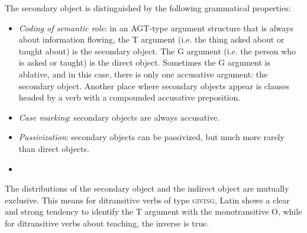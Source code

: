 \documentclass[a4paper, oneside]{report}
\newcommand{\classify}[1]{{\textsc{#1}}}
\begin{document}
The secondary object is distinguished by the following grammatical properties:
\begin{itemize}
    \item \emph{Coding of semantic role}: in an AGT-type argument structure
    that is always about information flowing,
    the T argument (i.e. the thing asked about or taught about) is the secondary object.
    The G argument (i.e. the person who is asked or taught) is the direct object.
    Sometimes the G argument is ablative, and in this case, 
    there is only one accusative argument: the secondary object.
    Another place where secondary objects appear is 
    clauses headed by a verb with a compounded accusative preposition. %
    \item \emph{Case marking}: secondary objects are always accusative.
    \item \emph{Passivization}: secondary objects can be passivized, but much more rarely than direct objects.
    \item %
\end{itemize}

The distributions of the secondary object and the indirect object 
are mutually exclusive.
This means for ditransitive verbs of type \classify{giving}, 
Latin shows a clear and strong tendency to identify the T argument with the monotransitive O,
while for ditransitive verbs about teaching,
the inverse is true.
\end{document}
